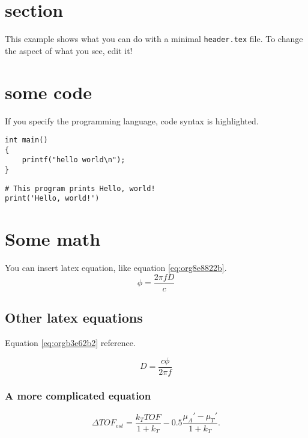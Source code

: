 


\maketitle

\newpage

\section{section}
\label{sec:org340b9a5}
This example shows what you can do with a minimal \texttt{header.tex} file.
To change the aspect of what you see, edit it!

\section{some code}
\label{sec:orgb0e85ae}
If you specify the programming language, code syntax is highlighted.
\begin{verbatim}
int main()
{
    printf("hello world\n");
}
\end{verbatim}

\begin{verbatim}
# This program prints Hello, world!
print('Hello, world!')
\end{verbatim}

\section{Some math}
\label{sec:org49f1e0e}
You can insert latex equation, like equation \ref{eq:org8e8822b}.
\begin{equation}
\label{eq:org8e8822b}
\phi = \frac{2\pi fD}{c}
\end{equation}
\subsection{Other latex equations}
\label{sec:orgf37af02}
Equation \ref{eq:orgb3e62b2} reference.

\begin{equation}
\label{eq:orgb3e62b2}
D = \frac{c\phi}{2\pi f}
\end{equation}

\subsubsection{A more complicated equation}
\label{sec:org47f1389}

\begin{equation}
\Delta TOF_{est} = \frac{k_T TOF}{1+k_T } - 0.5 \frac{\mu_A' - \mu_T'}{1+k_T}.
\end{equation}

